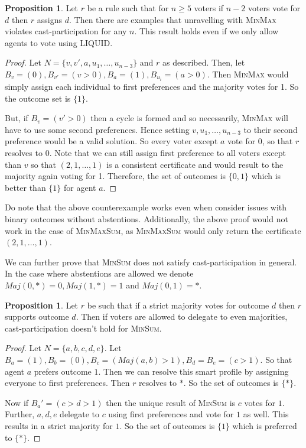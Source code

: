 \documentclass[11pt,a4paper, titlepage]{article}
\theoremstyle{definition}
\newtheorem{proposition}[theorem]{Proposition}
\begin{document}
\begin{proposition}
    Let $r$ be a rule such that for $n \geq 5$ voters if $n-2$ voters vote for $d$ then $r$ assigns $d$. Then there are examples that unravelling with \textsc{MinMax} violates cast-participation for any $n$. This result holds even if we only allow agents to vote using LIQUID.
\end{proposition}

\begin{proof}
    Let $N = \{v, v', a, u_1, \ldots, u_{n-3}\}$ and $r$ as described. Then, let $B_v = (0), B_{v'} = (v > 0), B_a = (1), B_{u_i} = (a > 0)$. Then \textsc{MinMax} would simply assign each individual to first preferences and the majority votes for 1. So the outcome set is $\{1\}$.

    But, if $B_v = (v' > 0)$ then a cycle is formed and so necessarily, \textsc{MinMax} will have to use some second preferences. Hence setting $v, u_1, \ldots, u_{n-3}$ to their second preference would be a valid solution. So every voter except $a$ vote for $0$, so that $r$ resolves to $0$. 
    Note that we can still assign first preference to all voters except than $v$ so that $(2, 1, \ldots, 1)$ is a consistent certificate and would result to the majority again voting for 1. 
    Therefore, the set of outcomes is $\{0, 1\}$ which is better than $\{1\}$ for agent $a$.
\end{proof}

Do note that the above counterexample works even when consider issues with binary outcomes without abstentions.
Additionally, the above proof would not work in the case of \textsc{MinMaxSum}, as \textsc{MinMaxSum} would only return the certificate $(2, 1, \ldots, 1)$.

We can further prove that \textsc{MinSum} does not satisfy cast-participation in general. 
In the case where abstentions are allowed we denote $\mathit{Maj}(0, *) = 0, \mathit{Maj}(1, *) = 1$ and $\mathit{Maj}(0, 1) = *$.

\begin{proposition}
    Let $r$ be such that if a strict majority votes for outcome $d$ then $r$ supports outcome $d$. Then if voters are allowed to delegate to even majorities, cast-participation doesn't hold for \textsc{MinSum}. 
\end{proposition}

\begin{proof}
    Let $N = \{a, b, c, d, e\}$. Let $B_a = (1), B_b = (0), B_c = (\mathit{Maj}(a, b) > 1), B_d = B_e = (c > 1)$. So that agent $a$ prefers outcome $1$. Then we can resolve this smart profile by assigning everyone to first preferences. Then $r$ resolves to $*$. So the set of outcomes is $\{*\}$.
    
    Now if $B_a' = (c > d > 1)$ then the unique result of \textsc{MinSum} is $c$ votes for $1$. Further, $a, d, e$ delegate to $c$ using first preferences and vote for $1$ as well. This results in a strict majority for $1$. So the set of outcomes is $\{1\}$ which is preferred to $\{*\}$.
\end{proof}
\end{document}
